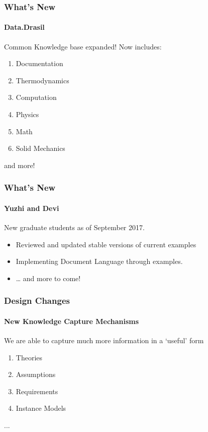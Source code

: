 \documentclass{beamer}
\begin{document}
\begin{frame}

\frametitle{What's New}

\framesubtitle{Data.Drasil}

Common Knowledge base expanded! Now includes:
\begin{enumerate}
\item Documentation
\item Thermodynamics 
\item Computation
\item Physics
\item Math
\item Solid Mechanics
\end{enumerate}
and more!

\end{frame}


\begin{frame}

\frametitle{What's New}
\framesubtitle{Yuzhi and Devi}

New graduate students as of September 2017.

\begin{itemize}
\item Reviewed and updated stable versions of current examples
\item Implementing Document Language through examples.
\item \ldots{} and more to come!
\end{itemize}

\end{frame}


\begin{frame}

\frametitle{Design Changes}
\framesubtitle{New Knowledge Capture Mechanisms}

We are able to capture much more information in a `useful' form

\begin{enumerate}
	\item Theories
	\item Assumptions
	\item Requirements
	\item Instance Models
\end{enumerate}
...

\end{frame}
\end{document}
